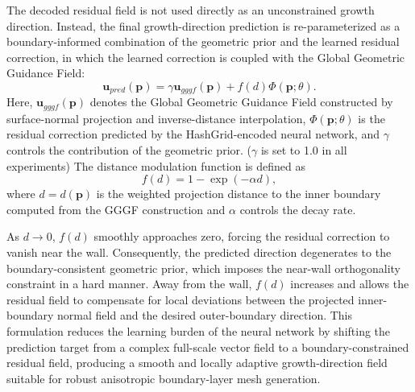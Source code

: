 \documentclass[%
 aip,
 amsmath,amssymb,
 reprint,%
nobibnotes,
]{revtex4-1}
\begin{document}
The decoded residual field is not used directly as an unconstrained growth direction.
Instead, the final growth-direction prediction is re-parameterized as a boundary-informed combination of the geometric prior and the learned residual correction, in which the learned correction is coupled with the Global Geometric Guidance Field:
    \begin{equation}
        \mathbf{u}_{pred}(\mathbf{p}) =
        \gamma \mathbf{u}_{gggf}(\mathbf{p}) +
        f(d)\Phi(\mathbf{p};\theta).
        \label{eq:u_pred}
    \end{equation}
Here, $\mathbf{u}_{gggf}(\mathbf{p})$ denotes the Global Geometric Guidance Field constructed by surface-normal projection and inverse-distance interpolation, $\Phi(\mathbf{p};\theta)$ is the residual correction predicted by the HashGrid-encoded neural network, and $\gamma$ controls the contribution of the geometric prior. 
(\(\gamma\) is set to 1.0 in all experiments)
The distance modulation function is defined as
    \begin{equation}
        f(d)=1-\exp(-\alpha d),
        \label{eq:distance_modulation}
    \end{equation}
where $d=d(\mathbf{p})$ is the weighted projection distance to the inner boundary computed from the GGGF construction and $\alpha$ controls the decay rate.

As $d \to 0$, $f(d)$ smoothly approaches zero, forcing the residual correction to vanish near the wall. Consequently, the predicted direction degenerates to the boundary-consistent geometric prior, which imposes the near-wall orthogonality constraint in a hard manner.
Away from the wall, $f(d)$ increases and allows the residual field to compensate for local deviations between the projected inner-boundary normal field and the desired outer-boundary direction.
This formulation reduces the learning burden of the neural network by shifting the prediction target from a complex full-scale vector field to a boundary-constrained residual field, producing a smooth and locally adaptive growth-direction field suitable for robust anisotropic boundary-layer mesh generation.
\end{document}
